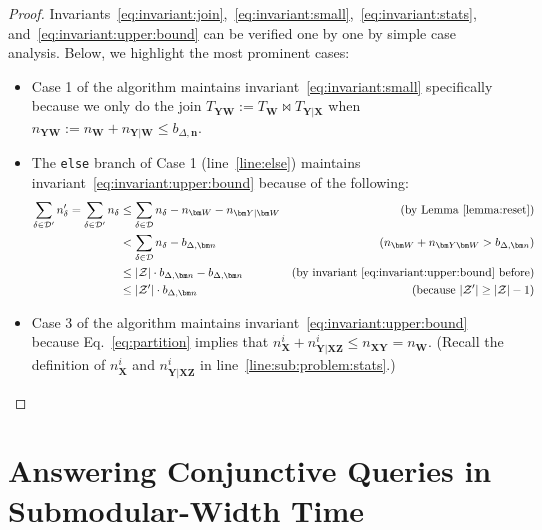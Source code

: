 \documentclass[10pt,a4paper]{article}
\newcommand{\calD}{\mathcal D}
\newcommand{\calZ}{\mathcal Z}
\begin{document}
\begin{proof}
  Invariants~\eqref{eq:invariant:join},~\eqref{eq:invariant:small},~\eqref{eq:invariant:stats},
  and~\eqref{eq:invariant:upper:bound} can be verified one by one by simple case analysis.
  Below, we highlight the most prominent cases:
  \begin{itemize}
    \item Case 1 of the algorithm maintains invariant~\eqref{eq:invariant:small} specifically
    because we only do the join $T_{\bm Y\bm W} := T_{\bm W} \Join T_{\bm Y|\bm X}$
    when $n_{\bm Y\bm W} := n_{\bm W}+n_{\bm Y|\bm W} \leq b_{\Delta,\bm n}$.
    \item The {\tt else} branch of Case 1 (line~\ref{line:else}) maintains invariant~\eqref{eq:invariant:upper:bound} because of the following:
    \begin{align*}
        \sum_{\delta \in \calD'}n'_{\delta} = \sum_{\delta \in \calD'}n_{\delta} &\leq
        \sum_{\delta \in \calD}n_{\delta} - n_{\bm W} - n_{\bm Y|\bm W}&\text{(by Lemma~\ref{lemma:reset})}\\
        &<\sum_{\delta \in \calD}n_{\delta} - b_{\Delta,\bm n}&\text{($n_{\bm W} + n_{\bm Y\bm W} > b_{\Delta, \bm n}$)}\\
        &\leq |\calZ|\cdot b_{\Delta,\bm n} - b_{\Delta,\bm n}&\text{(by invariant~\eqref{eq:invariant:upper:bound} before)}\\
        &\leq |\calZ'|\cdot b_{\Delta,\bm n}&\text{(because $|\calZ'| \geq |\calZ| - 1$)}
    \end{align*}
    \item Case 3 of the algorithm maintains invariant~\eqref{eq:invariant:upper:bound}
    because Eq.~\eqref{eq:partition} implies that $n_{\bm X}^i + n_{\bm Y | \bm X \bm Z}^i \leq
    n_{\bm X\bm Y} = n_{\bm W}$. (Recall the definition of $n_{\bm X}^i$ and $n_{\bm Y | \bm X \bm Z}^i$ in line~\ref{line:sub:problem:stats}.)\qedhere
  \end{itemize}
\end{proof}


\section{Answering Conjunctive Queries in Submodular-Width Time}
\label{sec:subw}
\end{document}
